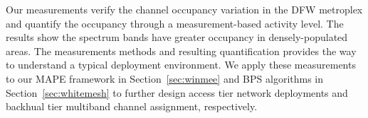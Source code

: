 Our measurements verify the channel occupancy variation in the DFW metroplex and quantify the occupancy
through a measurement-based activity level. The results show the spectrum bands have greater occupancy in
densely-populated areas. The measurements 
methods and resulting quantification provides the way to 
understand a typical deployment environment. We apply these 
measurements to our MAPE framework in Section~\ref{sec:winmee} and BPS algorithms in Section~\ref{sec:whitemesh} to 
further design access tier network deployments and backhual tier multiband channel assignment, respectively.
